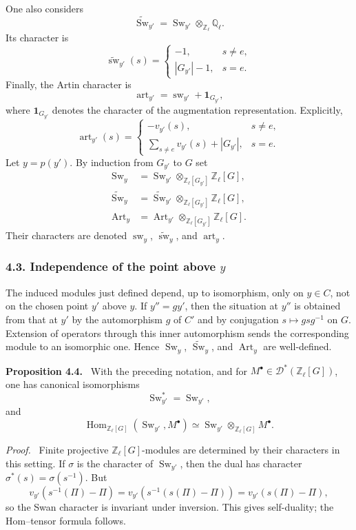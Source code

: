 \documentclass[11pt]{article}
\theoremstyle{plain}
\theoremstyle{definition}
\theoremstyle{remark}
\newenvironment{statement}[1]{\par\medskip\noindent\textbf{#1.}\ }{\par\medskip}
\newenvironment{prooftext}{\par\noindent\textit{Proof.}\ }{\par\medskip}
\newcommand{\QQ}{\mathbb Q}
\newcommand{\ZZ}{\mathbb Z}
\newcommand{\D}{\mathcal D}\newcommand{\E}{\mathcal E}\newcommand{\F}{\mathcal F}
\DeclareMathOperator{\Hom}{Hom}
\newcommand{\wt}[1]{\widetilde{#1}}
\providecommand{\Sw}{\operatorname{Sw}}
\providecommand{\Art}{\operatorname{Art}}
\begin{document}
One also considers
\[
   \wt{\Sw}_{y'}=\Sw_{y'}\otimes_{\ZZ_\ell}\QQ_\ell.
\]
Its character is
\[
   \widetilde{\operatorname{sw}}_{y'}(s)=
   \begin{cases}
      -1, & s\ne e,\\[0.3em]
      |G_{y'}|-1, & s=e.
   \end{cases}
\]
Finally, the Artin character is
\[
   \operatorname{art}_{y'}=\operatorname{sw}_{y'}+\mathbf 1_{G_{y'}},
\]
where $\mathbf 1_{G_{y'}}$ denotes the character of the augmentation representation. Explicitly,
\[
   \operatorname{art}_{y'}(s)=
   \begin{cases}
      -v_{y'}(s), & s\ne e,\\[0.3em]
      \sum_{s\ne e}v_{y'}(s)+|G_{y'}|, & s=e.
   \end{cases}
\]
Let $y=p(y')$. By induction from $G_{y'}$ to $G$ set
\[
\begin{aligned}
   \Sw_y &= \Sw_{y'}\otimes_{\ZZ_\ell[G_{y'}]}\ZZ_\ell[G],\\
   \wt{\Sw}_y &= \wt{\Sw}_{y'}\otimes_{\ZZ_\ell[G_{y'}]}\ZZ_\ell[G],\\
   \Art_y &= \Art_{y'}\otimes_{\ZZ_\ell[G_{y'}]}\ZZ_\ell[G].
\end{aligned}
\]
Their characters are denoted $\operatorname{sw}_y$, $\widetilde{\operatorname{sw}}_y$, and $\operatorname{art}_y$.

\subsubsection*{4.3. Independence of the point above $y$}

The induced modules just defined depend, up to isomorphism, only on $y\in C$, not on the chosen point $y'$ above $y$. If $y''=g y'$, then the situation at $y''$ is obtained from that at $y'$ by the automorphism $g$ of $C'$ and by conjugation $s\mapsto gsg^{-1}$ on $G$. Extension of operators through this inner automorphism sends the corresponding module to an isomorphic one. Hence $\Sw_y$, $\wt{\Sw}_y$, and $\Art_y$ are well-defined.

\begin{statement}{Proposition 4.4}
With the preceding notation, and for $M^\bullet\in\D^*(\ZZ_\ell[G])$, one has canonical isomorphisms
\[
   \Sw_{y'}^*=\Sw_{y'},
\]
and
\[
   \Hom_{\ZZ_\ell[G]}(\Sw_{y'},M^\bullet)
      \simeq \Sw_{y'}\otimes_{\ZZ_\ell[G]}M^\bullet.
\]
\end{statement}

\begin{prooftext}
Finite projective $\ZZ_\ell[G]$-modules are determined by their characters in this setting. If $\sigma$ is the character of $\Sw_{y'}$, then the dual has character $\sigma^*(s)=\sigma(s^{-1})$. But
\[
   v_{y'}(s^{-1}(\Pi)-\Pi)
    =v_{y'}(s^{-1}(s(\Pi)-\Pi))
    =v_{y'}(s(\Pi)-\Pi),
\]
so the Swan character is invariant under inversion. This gives self-duality; the Hom--tensor formula follows.
\end{prooftext}
\end{document}
